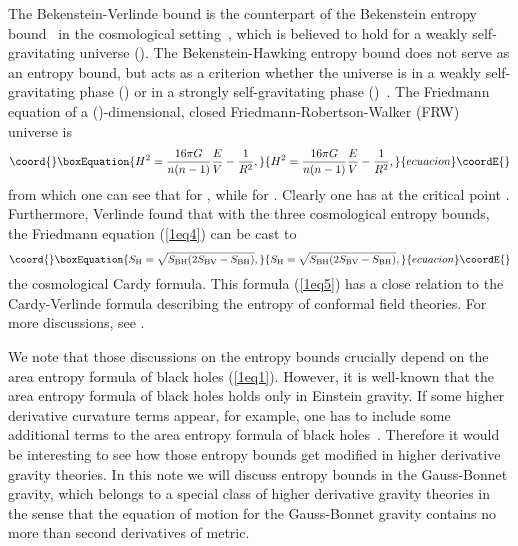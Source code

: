 \documentclass[a4paper,12pt]{article}
\begin{document}
The Bekenstein-Verlinde bound \coordHE{} is the counterpart of the Bekenstein entropy
bound~\cite{Beke} in the cosmological setting~\cite{CMO}, which is believed to hold
for a weakly
self-gravitating universe (\coordHE{}).  The Bekenstein-Hawking entropy bound
does not serve as an entropy bound, but acts as a criterion whether the universe is in a
weakly self-gravitating phase (\coordHE{}) or in a strongly self-gravitating phase
(\coordHE{})~\cite{Verl}.  The Friedmann
equation of a (\coordHE{})-dimensional, closed Friedmann-Robertson-Walker (FRW) universe is
\begin{equation}\coord{}\boxEquation{
\label{1eq4}
H^2 = \frac{16\pi G}{n(n-1)} \frac{E}{V} -\frac{1}{R^2},
}{
H^2 = \frac{16\pi G}{n(n-1)} \frac{E}{V} -\frac{1}{R^2},
}{ecuacion}\coordE{}\end{equation}
from which one can see that \coordHE{} for \coordHE{},
while \coordHE{} for \coordHE{}. Clearly one has \coordHE{} at the critical point \coordHE{}. Furthermore, Verlinde found that with the three
cosmological entropy bounds, the Friedmann equation (\ref{1eq4}) can be cast to
\begin{equation}\coord{}\boxEquation{
\label{1eq5}
S_{\rm H}=\sqrt{S_{\rm BH} (2 S_{\rm BV}-S_{\rm BH})},
}{
S_{\rm H}=\sqrt{S_{\rm BH} (2 S_{\rm BV}-S_{\rm BH})},
}{ecuacion}\coordE{}\end{equation}
the cosmological Cardy formula. This formula (\ref{1eq5}) has a close relation to the
Cardy-Verlinde formula describing the entropy of conformal field theories. For
more discussions, see \cite{Verl}.


We note that those discussions on the entropy bounds crucially depend on the
area entropy formula of black holes (\ref{1eq1}). However, it is well-known
that the area entropy formula of black holes holds only in Einstein gravity.
If some higher derivative curvature terms appear, for example, one has to include some
additional terms to the area entropy formula of black holes~\cite{TM}.
Therefore it would be interesting to see how those entropy bounds get
modified in higher derivative gravity theories. In this note we will discuss entropy
bounds in the  Gauss-Bonnet gravity, which belongs to a special class of higher
derivative gravity theories in the sense that the equation of  motion for the
Gauss-Bonnet gravity  contains no more than second derivatives of metric.
\end{document}
